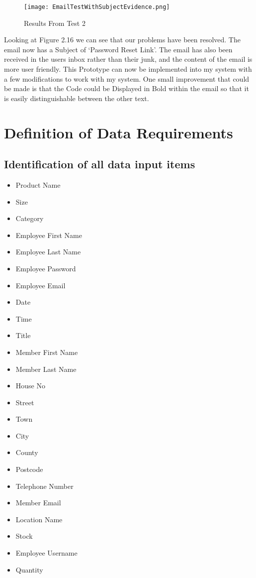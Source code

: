 \begin{figure}[H]
\caption{Results From Test 2} \label{fig:Results From Test 2}
\hfill\texttt{[image: EmailTestWithSubjectEvidence.png]}\hspace*{\fill}
\end{figure}

Looking at Figure 2.16 we can see that our problems have been resolved. The email now has a Subject of `Password Reset Link'. The email has also been received in the users inbox rather than their junk, and the content of the email is more user friendly. This Prototype can now be implemented into my system with a few modifications to work with my system. One small improvement that could be made is that the Code could be Displayed in Bold within the email so that it is easily distinguishable between the other text. \par
\pagebreak


\section{Definition of Data Requirements}

\subsection{Identification of all data input items}

\begin{itemize}
\item Product Name
\item Size
\item Category
\item Employee First Name
\item Employee Last Name
\item Employee Password
\item Employee Email
\item Date
\item Time
\item Title
\item Member First Name
\item Member Last Name
\item House No
\item Street
\item Town
\item City
\item County
\item Postcode
\item Telephone Number
\item Member Email
\item Location Name
\item Stock
\item Employee Username
\item Quantity
\end{itemize}

